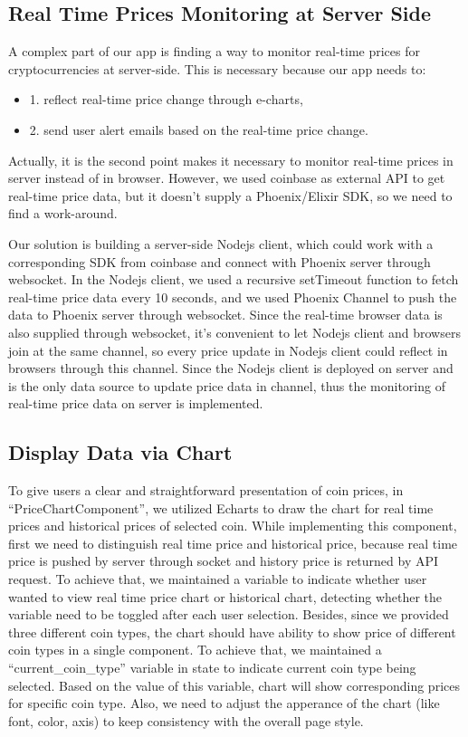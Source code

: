 \subsection{Real Time Prices Monitoring at Server Side}
A complex part of our app is finding a way to monitor real-time 
prices for cryptocurrencies at server-side. This is necessary 
because our app needs to: 
\begin{itemize}
\item 1. reflect real-time price change 
through e-charts, 
\item 2. send user alert emails based on the 
real-time price change. 
\end{itemize}
Actually, it is the second point 
makes it necessary to monitor real-time prices in server 
instead of in browser. However, we used coinbase as external 
API to get real-time price data, but it doesn't supply a 
Phoenix/Elixir SDK, so we need to find a work-around. 

Our solution is building a server-side Nodejs client, which 
could work with a corresponding SDK from coinbase and connect 
with Phoenix server through websocket. In the Nodejs client, 
we used a recursive setTimeout function to fetch real-time 
price data every 10 seconds, and we used Phoenix Channel to 
push the data to Phoenix server through websocket. Since the 
real-time browser data is also supplied through websocket, 
it's convenient to let Nodejs client and browsers join at 
the same channel, so every price update in Nodejs client 
could reflect in browsers through this channel. Since the 
Nodejs client is deployed on server and is the only data 
source to update price data in channel, thus the monitoring 
of real-time price data on server is implemented.

\subsection{Display Data via Chart}
To give users a clear and straightforward presentation of 
coin prices, in “PriceChartComponent”, we utilized Echarts 
to draw the chart for real time prices and historical prices 
of selected coin. While implementing this component, first we 
need to distinguish real time price and historical price, 
because real time price is pushed by server through socket 
and history price is returned by API request. To achieve that, 
we maintained a variable to indicate whether user wanted to 
view real time price chart or historical chart, detecting 
whether the variable need to be toggled after each user 
selection. Besides, since we provided three different coin 
types, the chart should have ability to show price of different 
coin types in a single component. To achieve that, we maintained 
a “current\_coin\_type” variable in state to indicate current 
coin type being selected. Based on the value of this variable, 
chart will show corresponding prices for specific coin type. 
Also, we need to adjust the apperance of the chart (like 
font, color, axis) to keep consistency with the overall page style.


